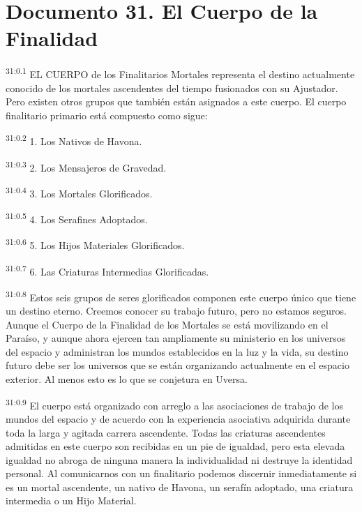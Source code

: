 \chapter{Documento 31. El Cuerpo de la Finalidad}
\par
\textsuperscript{31:0.1} EL CUERPO de los Finalitarios Mortales representa el destino actualmente conocido de los mortales ascendentes del tiempo fusionados con su Ajustador. Pero existen otros grupos que también están asignados a este cuerpo. El cuerpo finalitario primario está compuesto como sigue:

\par
\textsuperscript{31:0.2} 1. Los Nativos de Havona.

\par
\textsuperscript{31:0.3} 2. Los Mensajeros de Gravedad.

\par
\textsuperscript{31:0.4} 3. Los Mortales Glorificados.

\par
\textsuperscript{31:0.5} 4. Los Serafines Adoptados.

\par
\textsuperscript{31:0.6} 5. Los Hijos Materiales Glorificados.

\par
\textsuperscript{31:0.7} 6. Las Criaturas Intermedias Glorificadas.

\par
\textsuperscript{31:0.8} Estos seis grupos de seres glorificados componen este cuerpo único que tiene un destino eterno. Creemos conocer su trabajo futuro, pero no estamos seguros. Aunque el Cuerpo de la Finalidad de los Mortales se está movilizando en el Paraíso, y aunque ahora ejercen tan ampliamente su ministerio en los universos del espacio y administran los mundos establecidos en la luz y la vida, su destino futuro debe ser los universos que se están organizando actualmente en el espacio exterior. Al menos esto es lo que se conjetura en Uversa.

\par
\textsuperscript{31:0.9} El cuerpo está organizado con arreglo a las asociaciones de trabajo de los mundos del espacio y de acuerdo con la experiencia asociativa adquirida durante toda la larga y agitada carrera ascendente. Todas las criaturas ascendentes admitidas en este cuerpo son recibidas en un pie de igualdad, pero esta elevada igualdad no abroga de ninguna manera la individualidad ni destruye la identidad personal. Al comunicarnos con un finalitario podemos discernir inmediatamente si es un mortal ascendente, un nativo de Havona, un serafín adoptado, una criatura intermedia o un Hijo Material.


